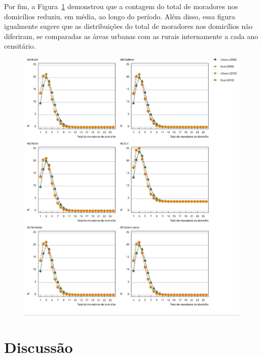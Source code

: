 \documentclass{article}
\begin{document}
Por fim, a Figura~\ref{fig:f4}
demonstrou que a contagem do total de moradores nos domicílios reduziu, em
média, ao longo do período. Além disso, essa figura igualmente sugere que as
distribuições do total de moradores nos domicílios não diferiram, se comparadas
as áreas urbanas com as rurais internamente a cada ano censitário.

\begin{figure}
\includegraphics[width=\textwidth]{1678-4464-csp-33-s1-e00085516-gf4.jpg}
\caption{}\label{fig:f4}
\end{figure}

\section{Discussão}
\end{document}
